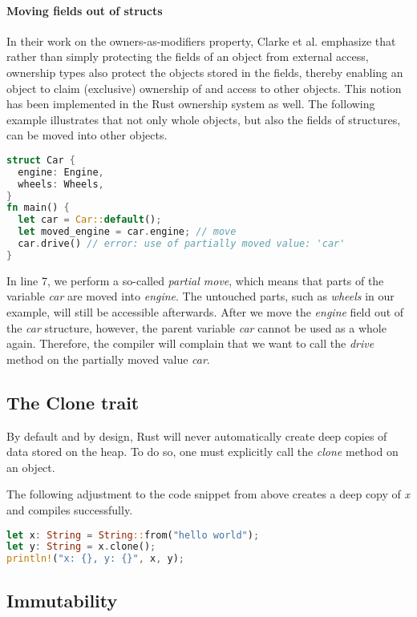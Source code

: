 \documentclass[sigplan,11pt,nonacm]{acmart}
\begin{document}
\paragraph{Moving fields out of structs}

In their work on the owners-as-modifiers property, Clarke et al. \cite{ownership-types-survey} emphasize that rather than simply protecting the fields of an object from external access, ownership types also protect the objects stored in the fields, thereby enabling an object to claim (exclusive) ownership of and access to other objects.
This notion has been implemented in the Rust ownership system as well.
The following example illustrates that not only whole objects, but also the fields of structures, can be moved into other objects.

\begin{lstlisting}[language=Rust]
struct Car {
  engine: Engine,
  wheels: Wheels,
}
fn main() {
  let car = Car::default();
  let moved_engine = car.engine; // move
  car.drive() // error: use of partially moved value: 'car'
}
\end{lstlisting}

In line 7, we perform a so-called \emph{partial move}, which means that parts of the variable \emph{car} are moved into \emph{engine}.
The untouched parts, such as \emph{wheels} in our example, will still be accessible afterwards.
After we move the \emph{engine} field out of the \emph{car} structure, however, the parent variable \emph{car} cannot be used as a whole again.
Therefore, the compiler will complain that we want to call the \emph{drive} method on the partially moved value \emph{car}.


\subsection{The Clone trait}
\label{sec:rust-clone-trait}

By default and by design, Rust will never automatically create deep copies of data stored on the heap.
To do so, one must explicitly call the \emph{clone} method on an object.

The following adjustment to the code snippet from above creates a deep copy of \emph{x} and compiles successfully.
\begin{lstlisting}[language=Rust]
let x: String = String::from("hello world");
let y: String = x.clone();
println!("x: {}, y: {}", x, y);
\end{lstlisting}


\subsection{Immutability}
\label{sec:rust-immutability}
\end{document}
